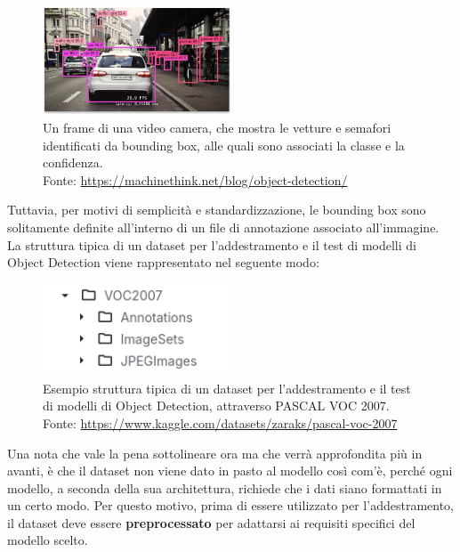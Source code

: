 \begin{figure}[H]
   \centering
   \includegraphics[width=0.5\textwidth]{images/car-bounding-boxes-sample.jpg}
       \caption{Un frame di una video camera, che mostra le vetture e semafori identificati da
       bounding box, alle quali sono associati la classe e la confidenza.\\
       Fonte: \url{https://machinethink.net/blog/object-detection/}}
   \label{fig:bounding_box}
\end{figure}


Tuttavia, per motivi di semplicità e standardizzazione, le bounding box sono
solitamente definite all'interno di un file di annotazione associato all'immagine.
La struttura tipica di un dataset per l'addestramento e il test di modelli di Object Detection
viene rappresentato nel seguente modo:


\begin{figure}[H]
   \centering
   \includegraphics[width=0.5\textwidth]{images/OD-dataset-sample-pascal-voc-07.png}
       \caption{Esempio struttura tipica di un dataset per l'addestramento e il test di modelli di Object Detection, attraverso PASCAL VOC 2007.\\
       Fonte: \url{https://www.kaggle.com/datasets/zaraks/pascal-voc-2007}}
   \label{fig:dataset_structure}


\end{figure}


Una nota che vale la pena sottolineare ora ma che verrà approfondita più in avanti, è che il dataset non viene dato in pasto al modello
così com'è, perché ogni modello, a seconda della sua architettura, richiede che i dati
siano formattati in un certo modo. Per questo motivo, prima di essere utilizzato per
l'addestramento, il dataset deve essere \textbf{preprocessato} per adattarsi ai requisiti specifici del modello scelto.





